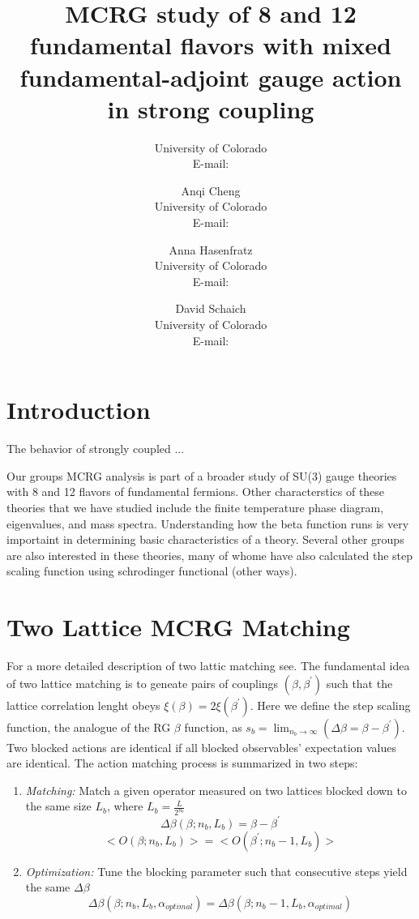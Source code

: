 \documentclass{PoS}
\title{MCRG study of 8 and 12 fundamental flavors with mixed fundamental-adjoint gauge action in strong coupling}
\author{\speaker{Gregory Petropoulos}%
        University of Colorado\\
        E-mail: \email{gregory.petropoulos@colorado.edu}}
\author{Anqi Cheng\\
        University of Colorado\\
        E-mail: \email{chenganqi498@gmail.com}}
\author{Anna Hasenfratz\\
        University of Colorado\\
        E-mail: \email{anna@eotvos.colorado.edu}}
\author{David Schaich\\
        University of Colorado\\
        E-mail: \email{daschaich@gmail.com}}
\begin{document}
\section{Introduction}
The behavior of strongly coupled ...

Our groups MCRG analysis is part of a broader study of SU(3) gauge theories with 8 and 12 flavors of fundamental fermions.  Other characterstics of these theories that we have studied include the finite temperature phase diagram, eigenvalues, and mass spectra.  Understanding how the beta function runs is very importaint in determining basic characteristics of a theory.  Several other groups are also interested in these theories, many of whome have also calculated the step scaling function using schrodinger functional (other ways).  

\section{Two Lattice MCRG Matching}
For a more detailed description of two lattic matching see\cite{annaMCRG}.  The fundamental idea of two lattice matching is to geneate pairs of couplings $(\beta, \beta^{\prime})$ such that the lattice correlation lenght obeys $\xi(\beta)=2\xi(\beta^{\prime})$.  Here we define the step scaling function, the analogue of the RG $\beta$ function, as $s_b= \lim_{n_b\to\infty}(\Delta\beta=\beta − \beta^{\prime})$.  Two blocked actions are identical if all blocked observables' expectation values are identical.  The action matching process is summarized in two steps:

\begin{enumerate}
\item \emph{Matching:}  Match a given operator measured on two lattices blocked down to the same size $L_b$, where $L_b=\frac{L}{2^{n_b}}$
\begin{equation}
\Delta\beta(\beta;n_b,L_b)=\beta-\beta^{\prime}
\end{equation}
\begin{equation}
<O(\beta;n_b,L_b)>=<O(\beta^{\prime};n_b-1,L_b)>
\end{equation}
\item \emph{Optimization:}  Tune the blocking parameter such that consecutive steps yield the same $\Delta\beta$
\begin{equation}
\Delta\beta(\beta;n_b,L_b,\alpha_{optimal})=\Delta\beta(\beta;n_b-1,L_b,\alpha_{optimal})
\end{equation}
\end{enumerate}
\end{document}
